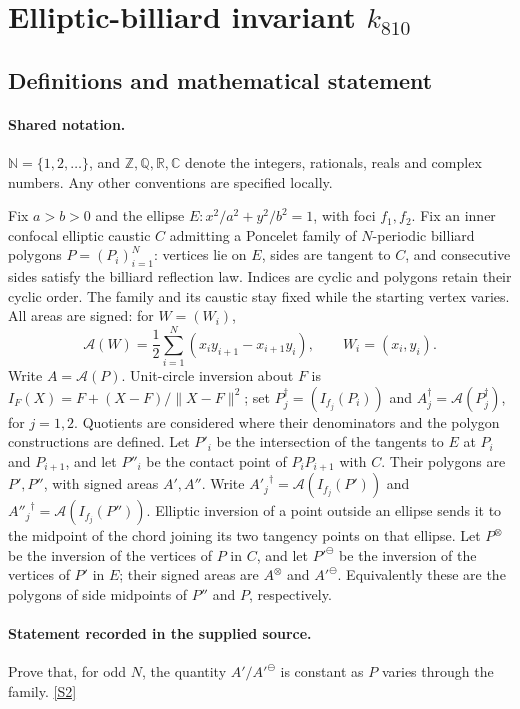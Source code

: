 \documentclass[11pt]{article}
\newcommand{\sref}[2]{\hyperlink{source:#1:#2}{[S#2]}}
\begin{document}
\section{Elliptic-billiard invariant $k_{810}$}\label{statement}

\subsection{Definitions and mathematical statement}

\paragraph{Shared notation.}$\mathbb N=\{1,2,\ldots\}$, and $\mathbb Z,\mathbb Q,\mathbb R,\mathbb C$ denote the integers, rationals, reals and complex numbers. Any other conventions are specified locally.


Fix $a>b>0$ and the ellipse $E:x^2/a^2+y^2/b^2=1$, with foci $f_1,f_2$. Fix an inner confocal elliptic caustic $C$ admitting a Poncelet family of $N$-periodic billiard polygons $P=(P_i)_{i=1}^N$: vertices lie on $E$, sides are tangent to $C$, and consecutive sides satisfy the billiard reflection law. Indices are cyclic and polygons retain their cyclic order. The family and its caustic stay fixed while the starting vertex varies. All areas are signed: for $W=(W_i)$,
\[\mathcal A(W)=\frac12\sum_{i=1}^N(x_i y_{i+1}-x_{i+1}y_i),\qquad W_i=(x_i,y_i).\]
Write $A=\mathcal A(P)$. Unit-circle inversion about $F$ is $I_F(X)=F+(X-F)/\lVert X-F\rVert^2$; set $P_j^\dagger=(I_{f_j}(P_i))$ and $A_j^\dagger=\mathcal A(P_j^\dagger)$, for $j=1,2$. Quotients are considered where their denominators and the polygon constructions are defined. Let $P'_i$ be the intersection of the tangents to $E$ at $P_i$ and $P_{i+1}$, and let $P''_i$ be the contact point of $P_iP_{i+1}$ with $C$. Their polygons are $P',P''$, with signed areas $A',A''$. Write ${A'_j}^\dagger=\mathcal A(I_{f_j}(P'))$ and ${A''_j}^\dagger=\mathcal A(I_{f_j}(P''))$. Elliptic inversion of a point outside an ellipse sends it to the midpoint of the chord joining its two tangency points on that ellipse. Let $P^\otimes$ be the inversion of the vertices of $P$ in $C$, and let ${P'}^\ominus$ be the inversion of the vertices of $P'$ in $E$; their signed areas are $A^\otimes$ and ${A'}^\ominus$. Equivalently these are the polygons of side midpoints of $P''$ and $P$, respectively.
\paragraph{Statement recorded in the supplied source.}
Prove that, for odd $N$, the quantity $A'/{A'}^\ominus$ is constant as $P$ varies through the family. \sref{statement}{2}
\end{document}
